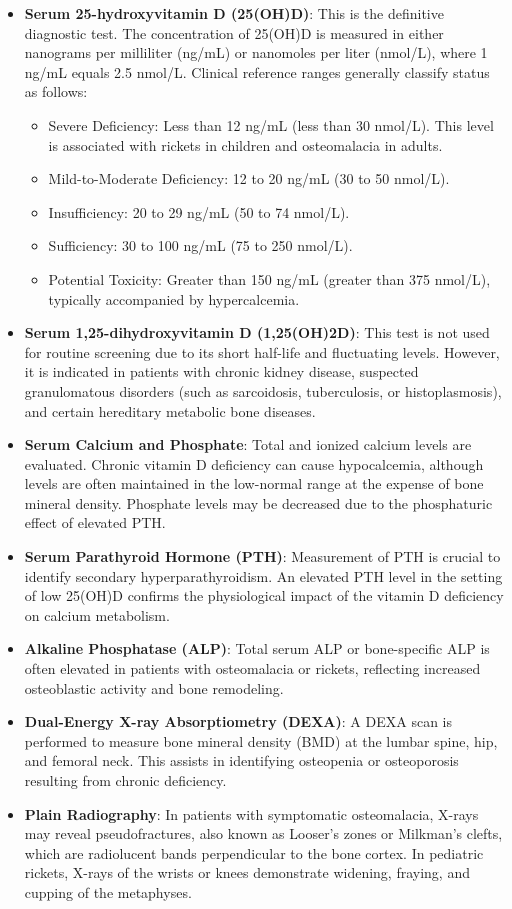 \begin{itemize}
    \item \textbf{Serum 25-hydroxyvitamin D (25(OH)D)}: This is the definitive diagnostic test. The concentration of 25(OH)D is measured in either nanograms per milliliter (ng/mL) or nanomoles per liter (nmol/L), where 1 ng/mL equals 2.5 nmol/L. Clinical reference ranges generally classify status as follows:
    \begin{itemize}
        \item Severe Deficiency: Less than 12 ng/mL (less than 30 nmol/L). This level is associated with rickets in children and osteomalacia in adults.
        \item Mild-to-Moderate Deficiency: 12 to 20 ng/mL (30 to 50 nmol/L).
        \item Insufficiency: 20 to 29 ng/mL (50 to 74 nmol/L).
        \item Sufficiency: 30 to 100 ng/mL (75 to 250 nmol/L).
        \item Potential Toxicity: Greater than 150 ng/mL (greater than 375 nmol/L), typically accompanied by hypercalcemia.
    \end{itemize}
    \item \textbf{Serum 1,25-dihydroxyvitamin D (1,25(OH)2D)}: This test is not used for routine screening due to its short half-life and fluctuating levels. However, it is indicated in patients with chronic kidney disease, suspected granulomatous disorders (such as sarcoidosis, tuberculosis, or histoplasmosis), and certain hereditary metabolic bone diseases.
    \item \textbf{Serum Calcium and Phosphate}: Total and ionized calcium levels are evaluated. Chronic vitamin D deficiency can cause hypocalcemia, although levels are often maintained in the low-normal range at the expense of bone mineral density. Phosphate levels may be decreased due to the phosphaturic effect of elevated PTH.
    \item \textbf{Serum Parathyroid Hormone (PTH)}: Measurement of PTH is crucial to identify secondary hyperparathyroidism. An elevated PTH level in the setting of low 25(OH)D confirms the physiological impact of the vitamin D deficiency on calcium metabolism.
    \item \textbf{Alkaline Phosphatase (ALP)}: Total serum ALP or bone-specific ALP is often elevated in patients with osteomalacia or rickets, reflecting increased osteoblastic activity and bone remodeling.
    \item \textbf{Dual-Energy X-ray Absorptiometry (DEXA)}: A DEXA scan is performed to measure bone mineral density (BMD) at the lumbar spine, hip, and femoral neck. This assists in identifying osteopenia or osteoporosis resulting from chronic deficiency.
    \item \textbf{Plain Radiography}: In patients with symptomatic osteomalacia, X-rays may reveal pseudofractures, also known as Looser's zones or Milkman's clefts, which are radiolucent bands perpendicular to the bone cortex. In pediatric rickets, X-rays of the wrists or knees demonstrate widening, fraying, and cupping of the metaphyses.
\end{itemize}

